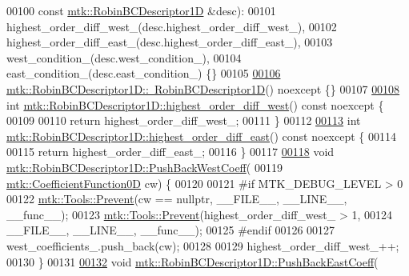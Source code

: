 \begin{DoxyCode}
00100     \textcolor{keyword}{const} \hyperlink{classmtk_1_1RobinBCDescriptor1D}{mtk::RobinBCDescriptor1D} &desc):
00101   highest\_order\_diff\_west\_(desc.highest\_order\_diff\_west\_),
00102   highest\_order\_diff\_east\_(desc.highest\_order\_diff\_east\_),
00103   west\_condition\_(desc.west\_condition\_),
00104   east\_condition\_(desc.east\_condition\_) \{\}
00105 
\hypertarget{mtk__robin__bc__descriptor__1d_8cc_source_l00106}{}\hyperlink{classmtk_1_1RobinBCDescriptor1D_a247cdbba1ae673d576b71829f2b82736}{00106} \hyperlink{classmtk_1_1RobinBCDescriptor1D_a247cdbba1ae673d576b71829f2b82736}{mtk::RobinBCDescriptor1D::~RobinBCDescriptor1D}() noexcept \{\}
00107 
\hypertarget{mtk__robin__bc__descriptor__1d_8cc_source_l00108}{}\hyperlink{classmtk_1_1RobinBCDescriptor1D_a1935b9e2e560ea5f176ac6e0a3823d50}{00108} \textcolor{keywordtype}{int} \hyperlink{classmtk_1_1RobinBCDescriptor1D_a1935b9e2e560ea5f176ac6e0a3823d50}{mtk::RobinBCDescriptor1D::highest\_order\_diff\_west}() 
      const noexcept \{
00109 
00110   \textcolor{keywordflow}{return} highest\_order\_diff\_west\_;
00111 \}
00112 
\hypertarget{mtk__robin__bc__descriptor__1d_8cc_source_l00113}{}\hyperlink{classmtk_1_1RobinBCDescriptor1D_a2e7419a5cd02721104bf9c1e52b6fb61}{00113} \textcolor{keywordtype}{int} \hyperlink{classmtk_1_1RobinBCDescriptor1D_a2e7419a5cd02721104bf9c1e52b6fb61}{mtk::RobinBCDescriptor1D::highest\_order\_diff\_east}() 
      const noexcept \{
00114 
00115   \textcolor{keywordflow}{return} highest\_order\_diff\_east\_;
00116 \}
00117 
\hypertarget{mtk__robin__bc__descriptor__1d_8cc_source_l00118}{}\hyperlink{classmtk_1_1RobinBCDescriptor1D_acdf8a75f8c39b3b8a032af81e0fd2e89}{00118} \textcolor{keywordtype}{void} \hyperlink{classmtk_1_1RobinBCDescriptor1D_acdf8a75f8c39b3b8a032af81e0fd2e89}{mtk::RobinBCDescriptor1D::PushBackWestCoeff}(
00119     \hyperlink{group__c07-mim__ops_ga04276745b4d511f0f3c636d6e0df7c2d}{mtk::CoefficientFunction0D} cw) \{
00120 
00121 \textcolor{preprocessor}{  #if MTK\_DEBUG\_LEVEL > 0}
00122   \hyperlink{classmtk_1_1Tools_a332324c6f25e66be9dff48c5987a3b9f}{mtk::Tools::Prevent}(cw == \textcolor{keyword}{nullptr}, \_\_FILE\_\_, \_\_LINE\_\_, \_\_func\_\_);
00123   \hyperlink{classmtk_1_1Tools_a332324c6f25e66be9dff48c5987a3b9f}{mtk::Tools::Prevent}(highest\_order\_diff\_west\_ > 1,
00124                       \_\_FILE\_\_, \_\_LINE\_\_, \_\_func\_\_);
00125 \textcolor{preprocessor}{  #endif}
00126 
00127   west\_coefficients\_.push\_back(cw);
00128 
00129   highest\_order\_diff\_west\_++;
00130 \}
00131 
\hypertarget{mtk__robin__bc__descriptor__1d_8cc_source_l00132}{}\hyperlink{classmtk_1_1RobinBCDescriptor1D_a7791c11e0950656cb5608a77918c28d4}{00132} \textcolor{keywordtype}{void} \hyperlink{classmtk_1_1RobinBCDescriptor1D_a7791c11e0950656cb5608a77918c28d4}{mtk::RobinBCDescriptor1D::PushBackEastCoeff}(

\end{DoxyCode}
